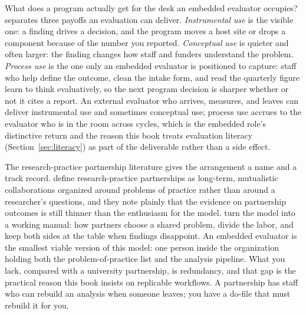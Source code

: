 \documentclass[
    a4paper,
    fontsize=10pt,
    twoside=true,
    numbers=noenddot,
]{kaobook}
\begin{document}
What does a program actually get for the desk an embedded evaluator occupies? \textcite{patton2008utilization} separates three payoffs an evaluation can deliver. \emph{Instrumental use} is the visible one: a finding drives a decision, and the program moves a host site or drops a component because of the number you reported. \emph{Conceptual use} is quieter and often larger: the finding changes how staff and funders understand the problem. \emph{Process use} is the one only an embedded evaluator is positioned to capture: staff who help define the outcome, clean the intake form, and read the quarterly figure learn to think evaluatively, so the next program decision is sharper whether or not it cites a report. An external evaluator who arrives, measures, and leaves can deliver instrumental use and sometimes conceptual use; process use accrues to the evaluator who is in the room across cycles, which is the embedded role's distinctive return and the reason this book treats evaluation literacy (Section~\ref{sec:literacy}) as part of the deliverable rather than a side effect.

The research-practice partnership literature gives the arrangement a name and a track record. \textcite{coburn2016partnerships} define research-practice partnerships as long-term, mutualistic collaborations organized around problems of practice rather than around a researcher's questions, and they note plainly that the evidence on partnership outcomes is still thinner than the enthusiasm for the model. \textcite{penuel2017creating} turn the model into a working manual: how partners choose a shared problem, divide the labor, and keep both sides at the table when findings disappoint. An embedded evaluator is the smallest viable version of this model: one person inside the organization holding both the problem-of-practice list and the analysis pipeline. What you lack, compared with a university partnership, is redundancy, and that gap is the practical reason this book insists on replicable workflows. A partnership has staff who can rebuild an analysis when someone leaves; you have a do-file that must rebuild it for you.
\end{document}
